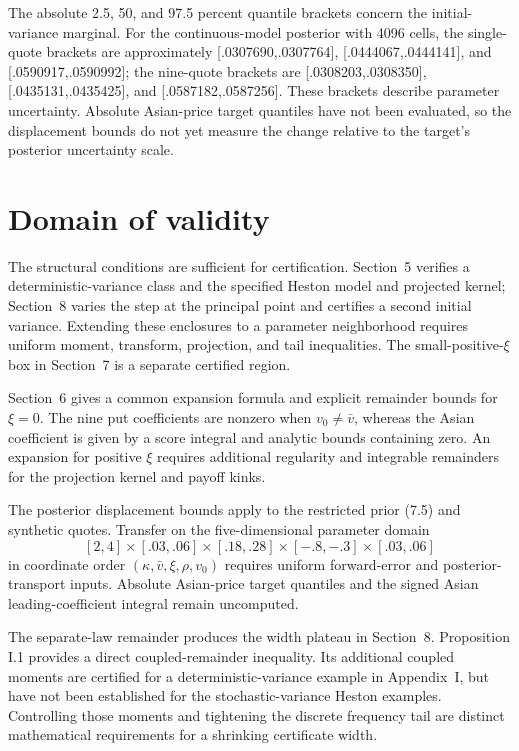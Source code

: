 The absolute 2.5, 50, and 97.5 percent quantile brackets concern the
initial-variance marginal. For the continuous-model posterior with
4096 cells, the single-quote brackets are approximately
[.0307690,.0307764], [.0444067,.0444141], and [.0590917,.0590992]; the nine-quote
brackets are [.0308203,.0308350], [.0435131,.0435425], and [.0587182,.0587256].
These brackets describe parameter uncertainty. Absolute Asian-price target
quantiles have not been evaluated, so the displacement bounds do not yet
measure the change relative to the target's posterior uncertainty scale.


\section{Domain of validity}

The structural conditions are sufficient for certification. Section~5 verifies
a deterministic-variance class and the specified Heston model and projected
kernel; Section~8 varies the step at the principal point and certifies
a second initial variance. Extending these
enclosures to a parameter neighborhood requires uniform moment, transform,
projection, and tail inequalities. The small-positive-\(\xi\) box in Section~7
is a separate certified region.

Section~6 gives a common expansion formula and explicit remainder bounds for
\(\xi=0\). The nine put coefficients are nonzero when \(v_0\ne\bar v\),
whereas the Asian coefficient is given by a score integral and analytic bounds
containing zero. An expansion for positive \(\xi\) requires additional regularity
and integrable remainders for the projection kernel and payoff kinks.

The posterior displacement bounds apply to the restricted prior (7.5) and
synthetic quotes. Transfer on the five-dimensional parameter domain
\[
[2,4]\times[.03,.06]\times[.18,.28]\times[-.8,-.3]\times[.03,.06]
\]
in coordinate order \((\kappa,\bar v,\xi,\rho,v_0)\) requires uniform forward-error and posterior-transport inputs. Absolute
Asian-price target quantiles and the signed Asian leading-coefficient integral
remain uncomputed.

The separate-law remainder produces the width plateau in Section~8. Proposition
I.1 provides a direct coupled-remainder inequality. Its additional coupled
moments are certified for a deterministic-variance example in Appendix~I,
but have not been established for the stochastic-variance Heston examples. Controlling those
moments and tightening the discrete frequency tail are distinct mathematical
requirements for a shrinking certificate width.

